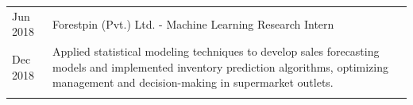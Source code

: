 \begin{tabular}{p{1.5cm}|p{15.8cm}}
    Jun 2018& Forestpin (Pvt.) Ltd. - Machine Learning Research Intern \textsc{} \\Dec 2018&\footnotesize{Applied statistical modeling techniques to develop sales forecasting models and implemented inventory prediction algorithms, optimizing management and decision-making in supermarket outlets.}\\
 \multicolumn{2}{c}{} \vspace{-0.08in}\\
\end{tabular}